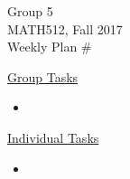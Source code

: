 \documentclass[12pt]{article}
\begin{document}
  \begin{center}
    Group 5\\
    MATH512, Fall 2017\\
    Weekly Plan #
  \end{center}
  \underline{Group Tasks}
  \begin{itemize}
    \item
  \end{itemize}
  \underline{Individual Tasks}
  \begin{itemize}
    \item 
  \end{itemize}
\end{document}
